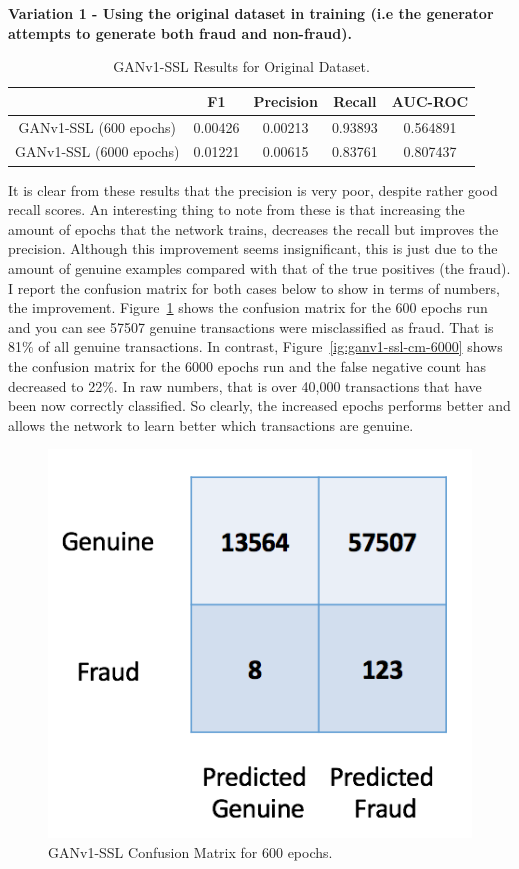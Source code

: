 \documentclass[12pt,a4paper,twoside]{report}
\begin{document}
\textbf{Variation 1 - Using the original dataset in training (i.e the generator attempts to generate both fraud and non-fraud).}

\begin{table}[H]  
  \centering
  \begin{tabular}{ccccc}
    \toprule
           		& F1 & Precision & Recall & AUC-ROC \\ \midrule
    GANv1-SSL (600 epochs) & 0.00426  &  0.00213 & 0.93893  & 0.564891 \\
    GANv1-SSL (6000 epochs) & 0.01221   &   0.00615 & 0.83761 & 0.807437  \\
   
   \bottomrule
 \end{tabular}
 \caption{GANv1-SSL Results for Original Dataset.}
\label{table:ganv1-ssl-original}
\end{table}

It is clear from these results that the precision is very poor, despite rather good recall scores. An interesting thing to note from these is that increasing the amount of epochs that the network trains, decreases the recall but improves the precision. Although this improvement seems insignificant, this is just due to the amount of genuine examples compared with that of the true positives (the fraud). I report the confusion matrix for both cases below to show in terms of numbers, the improvement. Figure~\ref{fig:ganv1-ssl-cm-600} shows the confusion matrix for the 600 epochs run and you can see 57507 genuine transactions were misclassified as fraud. That is 81\% of all genuine transactions. In contrast, Figure~\ref{ig:ganv1-ssl-cm-6000} shows the confusion matrix for the 6000 epochs run and the false negative count has decreased to 22\%. In raw numbers, that is over 40,000 transactions that have been now correctly classified. So clearly, the increased epochs performs better and allows the network to learn better which transactions are genuine. 

\begin{figure}[H]
\centering
\includegraphics[scale=0.6]{ganv1-ssl-cm-600}
\caption{GANv1-SSL Confusion Matrix for 600 epochs.}
\label{fig:ganv1-ssl-cm-600}
\end{figure}
\end{document}
